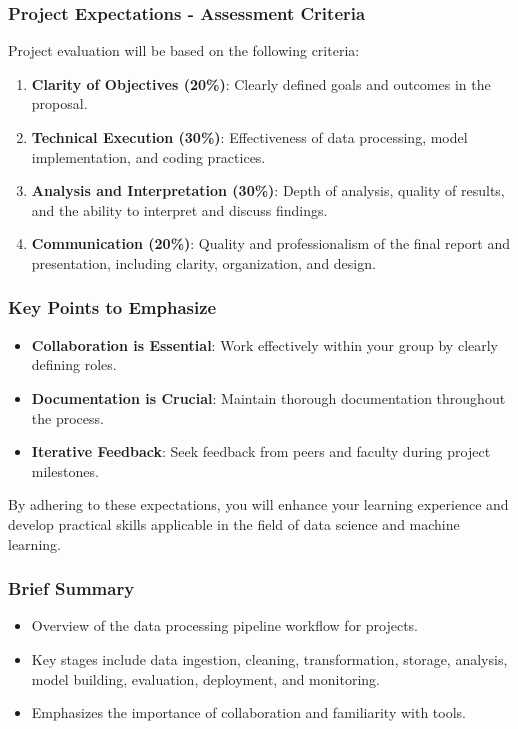 \documentclass[aspectratio=169]{beamer}
\begin{document}
\begin{frame}[fragile]
    \frametitle{Project Expectations - Assessment Criteria}
    Project evaluation will be based on the following criteria:
    \begin{enumerate}
        \item \textbf{Clarity of Objectives (20\%)}: Clearly defined goals and outcomes in the proposal.
        \item \textbf{Technical Execution (30\%)}: Effectiveness of data processing, model implementation, and coding practices.
        \item \textbf{Analysis and Interpretation (30\%)}: Depth of analysis, quality of results, and the ability to interpret and discuss findings.
        \item \textbf{Communication (20\%)}: Quality and professionalism of the final report and presentation, including clarity, organization, and design.
    \end{enumerate}
\end{frame}

\begin{frame}[fragile]
    \frametitle{Key Points to Emphasize}
    \begin{itemize}
        \item \textbf{Collaboration is Essential}: Work effectively within your group by clearly defining roles.
        \item \textbf{Documentation is Crucial}: Maintain thorough documentation throughout the process.
        \item \textbf{Iterative Feedback}: Seek feedback from peers and faculty during project milestones.
    \end{itemize}
    By adhering to these expectations, you will enhance your learning experience and develop practical skills applicable in the field of data science and machine learning.
\end{frame}

\begin{frame}[fragile]
    \titlepage
\end{frame}

\begin{frame}[fragile]
    \frametitle{Brief Summary}
    \begin{itemize}
        \item Overview of the data processing pipeline workflow for projects.
        \item Key stages include data ingestion, cleaning, transformation, storage, analysis, model building, evaluation, deployment, and monitoring.
        \item Emphasizes the importance of collaboration and familiarity with tools.
    \end{itemize}
\end{frame}
\end{document}
